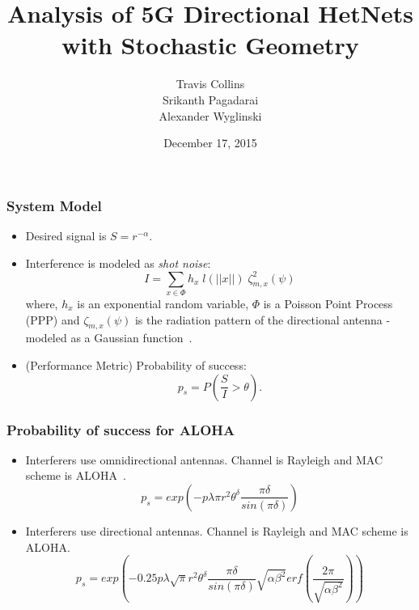 \documentclass{beamer}
\title{\textcolor{WPI_red} {Analysis of 5G Directional HetNets \\with Stochastic Geometry}}
\author{Travis Collins\\ Srikanth Pagadarai \\ Alexander Wyglinski}
\date{December 17, 2015}
\begin{document}
\frame{\maketitle}


\begin{frame}
\frametitle{\color{WPI_red} System Model}
\begin{itemize}

\item Desired signal is $S = r^{-\alpha}$.
\item Interference is modeled as \textit{shot noise}: 
\begin{equation*}
I = \sum_{x\in \Phi} h_x\;l(||x||)\; \zeta_{m, x}^2(\psi)
\end{equation*}
where, $h_x$ is an exponential random variable, $\Phi$ is a Poisson Point Process (PPP) and $\zeta_{m, x}(\psi)$ is the radiation pattern of the directional antenna - modeled as a Gaussian function~\cite{werner2015}. 

\item (Performance Metric) Probability of success: 
\begin{equation*}
p_s = P\left( \frac{S}{I} > \theta \right).
\end{equation*}

\end{itemize}

\end{frame}




\begin{frame}
\frametitle{\color{WPI_red} Probability of success for ALOHA}
\begin{itemize}

\item Interferers use omnidirectional antennas. Channel is Rayleigh and MAC scheme is ALOHA~\cite{haenggi2009}.
\begin{equation*}
p_s = exp\left(-p\lambda\pi r^2\theta^\delta\frac{\pi \delta}{sin(\pi\delta)}\right)
\end{equation*}

\item Interferers use directional antennas. Channel is Rayleigh and MAC scheme is ALOHA.
\begin{equation*}
p_s = exp\left(-0.25p\lambda\sqrt{\pi} r^2\theta^\delta\frac{\pi \delta}{sin(\pi\delta)}\sqrt{\alpha\beta^2} erf\left(\frac{2\pi}{\sqrt{\alpha\beta^2}}\right)\right)
\end{equation*}



\end{itemize}

\end{frame}
\end{document}
